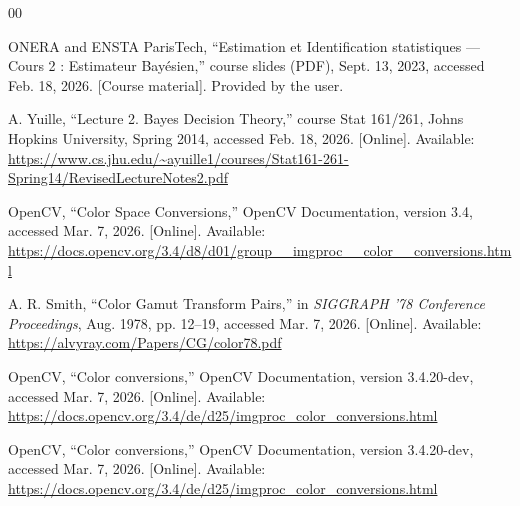 \documentclass[conference]{IEEEtran}
\begin{document}




\begin{thebibliography}{00}
    
ONERA and ENSTA ParisTech, ``Estimation et Identification statistiques --- Cours 2 : Estimateur Bayésien,'' course slides (PDF), Sept. 13, 2023, accessed Feb. 18, 2026. [Course material]. Provided by the user.

A. Yuille, ``Lecture 2. Bayes Decision Theory,'' course Stat 161/261, Johns Hopkins University, Spring 2014, accessed Feb. 18, 2026. [Online]. Available: \url{https://www.cs.jhu.edu/~ayuille1/courses/Stat161-261-Spring14/RevisedLectureNotes2.pdf}

OpenCV, ``Color Space Conversions,'' OpenCV Documentation, version 3.4, accessed Mar. 7, 2026. [Online]. Available: \url{https://docs.opencv.org/3.4/d8/d01/group__imgproc__color__conversions.html}

A. R. Smith, ``Color Gamut Transform Pairs,'' in \textit{SIGGRAPH '78 Conference Proceedings}, Aug. 1978, pp. 12--19, accessed Mar. 7, 2026. [Online]. Available: \url{https://alvyray.com/Papers/CG/color78.pdf}

OpenCV, ``Color conversions,'' OpenCV Documentation, version 3.4.20-dev, accessed Mar. 7, 2026. [Online]. Available: \url{https://docs.opencv.org/3.4/de/d25/imgproc_color_conversions.html}

OpenCV, ``Color conversions,'' OpenCV Documentation, version 3.4.20-dev, accessed Mar. 7, 2026. [Online]. Available: \url{https://docs.opencv.org/3.4/de/d25/imgproc_color_conversions.html}
\end{thebibliography}
\end{document}

